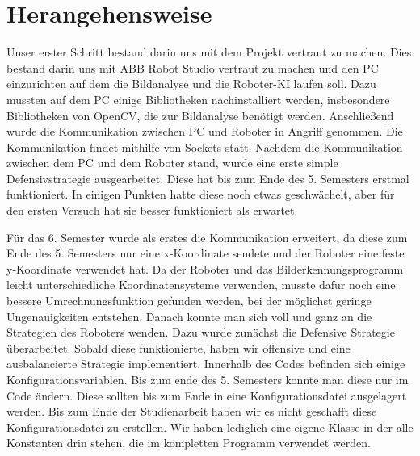 \chapter{Herangehensweise}
Unser erster Schritt bestand darin uns mit dem Projekt vertraut zu machen. Dies bestand darin uns mit ABB Robot Studio vertraut zu machen und den PC einzurichten auf dem die Bildanalyse und die Roboter-KI laufen soll. Dazu mussten auf dem PC einige Bibliotheken nachinstalliert werden, insbesondere Bibliotheken von OpenCV, die zur Bildanalyse benötigt werden. Anschließend wurde die Kommunikation zwischen PC und Roboter in Angriff genommen. Die Kommunikation findet mithilfe von Sockets statt. Nachdem die Kommunikation zwischen dem PC und dem Roboter stand, wurde eine erste simple Defensivstrategie ausgearbeitet. Diese hat bis zum Ende des 5. Semesters erstmal funktioniert. In einigen Punkten hatte diese noch etwas geschwächelt, aber für den ersten Versuch hat sie besser funktioniert als erwartet.

Für das 6. Semester wurde als erstes die Kommunikation erweitert, da diese zum Ende des 5. Semesters nur eine x-Koordinate sendete und der Roboter eine feste y-Koordinate verwendet hat. Da der Roboter und das Bilderkennungsprogramm leicht unterschiedliche Koordinatensysteme verwenden, musste dafür noch eine bessere Umrechnungsfunktion gefunden werden, bei der möglichst geringe Ungenauigkeiten entstehen. Danach konnte man sich voll und ganz an die Strategien des Roboters wenden. Dazu wurde zunächst die Defensive Strategie überarbeitet. Sobald diese funktionierte, haben wir offensive und eine ausbalancierte Strategie implementiert. Innerhalb des Codes befinden sich einige Konfigurationsvariablen. Bis zum ende des 5. Semesters konnte man diese nur im Code ändern. Diese sollten bis zum Ende in eine Konfigurationsdatei ausgelagert werden. Bis zum Ende der Studienarbeit haben wir es nicht geschafft diese Konfigurationsdatei zu erstellen. Wir haben lediglich eine eigene Klasse in der alle Konstanten drin stehen, die im kompletten Programm verwendet werden.

